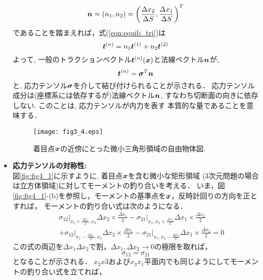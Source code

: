 \documentclass[10pt,a4j]{jbook}
\begin{document}
\begin{itemize}
	\begin{equation}
		\mbox{\boldmath $n$}= \left(n_1,n_2\right)=\left( \frac{\Delta x_2}{\Delta S}, \frac{\Delta x_1}{\Delta S}\right)^T
	\end{equation}
	であることを踏まえれば，式(\ref{eqn:equib_tri})は
	\begin{equation}
		\mbox{\boldmath $t$}^{(n)}=n_1\mbox{\boldmath $t$}^{(1)}+n_2\mbox{\boldmath $t$}^{(2)} 
	\end{equation}
	よって, 一般のトラクションベクトル$\mbox{\boldmath $t$}^{(n)}(\mbox{\boldmath $x$})$と法線ベクトル$\mbox{\boldmath $n$}$が, 
	\begin{equation}
		\mbox{\boldmath $t$}^{(n)}=\mbox{\boldmath $\sigma$}^{T}\mbox{\boldmath $n$}
		\label{eqn:t_as_sign}
	\end{equation}
	と, 応力テンソル$\mbox{\boldmath $\sigma$}$を介して結び付けられることが示される．
	応力テンソル成分は(座標系には依存するが)法線ベクトル$\mbox{\boldmath $n$}$, 
	すなわち切断面の向きに依存しない. このことは, 応力テンソルが内力を表す
	本質的な量であることを意味する．
	\begin{figure}[h]
		\begin{center}
		\texttt{[image: fig3\_4.eps]} 
		\end{center}
		\caption{着目点$\mbox{\boldmath $x$}$の近傍にとった微小三角形領域の自由物体図.}
		\label{fig:fig3_4}
									\end{figure}
\item
	{\bf 応力テンソルの対称性:}\\
	図\ref{fig:fig4_1}に示すように, 着目点$\mbox{\boldmath $x$}$を含む微小な矩形領域
	(3次元問題の場合は立方体領域)に対してモーメントの釣り合いを考える．
	いま，図\ref{fig:fig4_1}-(b)を参照し，モーメントの基準点を$\mbox{\boldmath $x$}$，反時計回りの方向を正とすれば，
	モーメントの釣り合い式は次のようになる．
	\begin{eqnarray}
		&& \left. \sigma_{12}\right|_{x_1+\frac{\Delta x_1}{2},x_2}\Delta x_2  \times \frac{\Delta x_1}{2} 
		-
		\left. \sigma_{21}\right|_{x_1,x_2+\frac{\Delta x_2}{2}}\Delta x_1  \times \frac{\Delta x_2}{2} \nonumber \\
		&&
		+
		\left. \sigma_{12}\right|_{x_1-\frac{\Delta x_1}{2},x_2}\Delta x_2  \times \frac{\Delta x_1}{2} 
		-
		\left. \sigma_{21}\right|_{x_1,x_2-\frac{\Delta x_2}{2}}\Delta x_1  \times \frac{\Delta x_2}{2}
		=0
	\end{eqnarray}
	この式の両辺を$\Delta x_1\Delta x_2$で割，$\Delta x_1, \Delta x_2\rightarrow 0$の極限を取れば，
	\begin{equation}
		\sigma_{12}=\sigma_{21}
	\end{equation}
	となることが示される．
	$x_2x3$および$x_3x_1$平面内でも同じようにしてモーメントの釣り合い式を立てれば，

\end{itemize}
\end{document}

